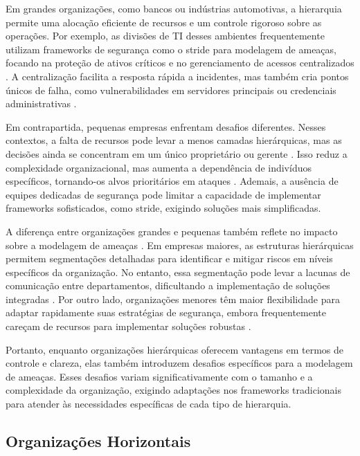 Em grandes organizações, como bancos ou indústrias automotivas, a
hierarquia permite uma alocação eficiente de recursos e um controle
rigoroso sobre as operações. Por exemplo, as divisões de TI desses
ambientes frequentemente utilizam frameworks de segurança como o
\gls{stride} para modelagem de ameaças, focando na proteção de ativos
críticos e no gerenciamento de acessos centralizados
\cite{MicrosoftThreatModelingTechnique, ThreatModelingASystematicLiteratureReview}.
A centralização facilita a resposta rápida a incidentes, mas também cria pontos únicos de falha,
como vulnerabilidades em servidores principais ou credenciais
administrativas \cite{DoArtifactsHavePolitics, BigTech}.

Em contrapartida, pequenas empresas enfrentam desafios diferentes. Nesses
contextos, a falta de recursos pode levar a menos camadas hierárquicas, mas
as decisões ainda se concentram em um único proprietário ou gerente \cite{WorkerCooperativesandRevolution}.
Isso reduz a complexidade organizacional, mas aumenta a dependência de
indivíduos específicos, tornando-os alvos prioritários em ataques
\cite{WorkerCooperativesinAmerica}. Ademais, a ausência de equipes
dedicadas de segurança pode limitar a capacidade de implementar frameworks
sofisticados, como \gls{stride}, exigindo soluções mais simplificadas.

A diferença entre organizações grandes e pequenas também reflete no impacto
sobre a modelagem de ameaças \cite{WorkerCooperativesinAmerica, ThreatModelingASummaryOfAvailableMethods}.
Em empresas maiores, as estruturas hierárquicas permitem segmentações detalhadas para identificar e mitigar
riscos em níveis específicos da organização. No entanto, essa segmentação
pode levar a lacunas de comunicação entre departamentos, dificultando a
implementação de soluções integradas
\cite{ThreatModelingASystematicLiteratureReview}. Por outro lado,
organizações menores têm maior flexibilidade para adaptar rapidamente suas
estratégias de segurança, embora frequentemente careçam de recursos para
implementar soluções robustas \cite{WorkerCooperativesandRevolution}.

Portanto, enquanto organizações hierárquicas oferecem vantagens em termos
de controle e clareza, elas também introduzem desafios específicos para a
modelagem de ameaças. Esses desafios variam significativamente com o
tamanho e a complexidade da organização, exigindo adaptações nos frameworks
tradicionais para atender às necessidades específicas de cada tipo de
hierarquia.

\subsection{Organizações Horizontais}
\label{sec:organizacoes_horizontais}

